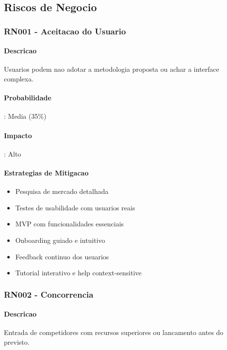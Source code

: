 \subsection{Riscos de Negocio}

\subsubsection{RN001 - Aceitacao do Usuario}

\paragraph{Descricao}
Usuarios podem nao adotar a metodologia proposta ou achar a interface complexa.

\paragraph{Probabilidade}: Media (35\%)
\paragraph{Impacto}: Alto

\paragraph{Estrategias de Mitigacao}
\begin{itemize}
    \item Pesquisa de mercado detalhada
    \item Testes de usabilidade com usuarios reais
    \item MVP com funcionalidades essenciais
    \item Onboarding guiado e intuitivo
    \item Feedback continuo dos usuarios
    \item Tutorial interativo e help context-sensitive
\end{itemize}

\subsubsection{RN002 - Concorrencia}

\paragraph{Descricao}
Entrada de competidores com recursos superiores ou lancamento antes do previsto.

